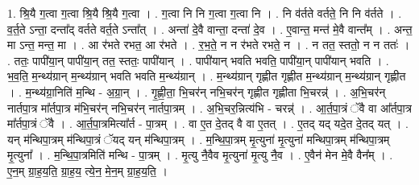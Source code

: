 \documentclass[17pt]{extarticle}
\begin{document}
1. श्रि॒यै ग॒त्वा ग॒त्वा श्रि॒यै श्रि॒यै ग॒त्वा । . ग॒त्वा नि नि ग॒त्वा ग॒त्वा नि । . नि व॑र्तते वर्तते॒ नि नि व॑र्तते । . व॒र्त॒ते ऽन्ता॒ दन्ता᳚द् वर्तते वर्त॒ते ऽन्ता᳚त् । . अन्ता॑ दे॒वै वान्ता॒ दन्ता॑ दे॒व । . ए॒वान्त॒ मन्त॑ मे॒वै वान्त᳚म् । . अन्त॒ मा ऽन्त॒ मन्त॒ मा । . आ र॑भते रभत॒ आ र॑भते । . र॒भ॒ते॒ न न र॑भते रभते॒ न । . न तत॒ स्ततो॒ न न ततः॑ । . ततः॒ पापी॑या॒न् पापी॑या॒न् तत॒ स्ततः॒ पापी॑यान् । . पापी॑यान् भवति भवति॒ पापी॑या॒न् पापी॑यान् भवति । . भ॒व॒ति॒ म॒न्थ्य॑ग्रान् म॒न्थ्य॑ग्रान् भवति भवति म॒न्थ्य॑ग्रान् । . म॒न्थ्य॑ग्रान् गृह्णीत गृह्णीत म॒न्थ्य॑ग्रान् म॒न्थ्य॑ग्रान् गृह्णीत । . म॒न्थ्य॑ग्रा॒निति॑ म॒न्थि - अ॒ग्रा॒न् । . गृ॒ह्णी॒ता॒ भि॒चर॑न् नभि॒चर॑न् गृह्णीत गृह्णीता भि॒चरन्न्॑ । . अ॒भि॒चर॑न् नार्तपा॒त्र मा᳚र्तपा॒त्र म॑भि॒चर॑न् नभि॒चर॑न् नार्तपा॒त्रम् । . अ॒भि॒चर॒न्नित्य॑भि - चरन्न्॑ । . आ॒र्त॒पा॒त्रं ॅवै वा आ᳚र्तपा॒त्र मा᳚र्तपा॒त्रं ॅवै । . आ॒र्त॒पा॒त्रमित्या᳚र्त - पा॒त्रम् । . वा ए॒त दे॒तद् वै वा ए॒तत् । . ए॒तद् यद् यदे॒त दे॒तद् यत् । . यन् म॑न्थिपा॒त्रम् म॑न्थिपा॒त्रं ॅयद् यन् म॑न्थिपा॒त्रम् । . म॒न्थि॒पा॒त्रम् मृ॒त्युना॑ मृ॒त्युना॑ मन्थिपा॒त्रम् म॑न्थिपा॒त्रम् मृ॒त्युना᳚ । . म॒न्थि॒पा॒त्रमिति॑ मन्थि - पा॒त्रम् । . मृ॒त्यु नै॒वैव मृ॒त्युना॑ मृ॒त्यु नै॒व । . ए॒वैन॑ मेन मे॒वै वैन᳚म् । . ए॒न॒म् ग्रा॒ह॒य॒ति॒ ग्रा॒ह॒य॒ त्ये॒न॒ मे॒न॒म् ग्रा॒ह॒य॒ति॒ । \newline
\end{document}
